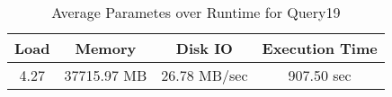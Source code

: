 \documentclass[../../main.tex]{subfiles}
\begin{document}
    \begin{table}
        \begin{center}
            \begin{tabular}{ |c|c|c|c| } 
            \hline
            Load & Memory & Disk IO & Execution Time\\
            \hline
            4.27 & 37715.97 MB & 26.78 MB/sec & 907.50 sec \\
            \hline
            \end{tabular}
            \\[1pt]
            \caption{Average Parametes over Runtime for Query19}
        \end{center}
    \end{table}
    \pagebreak
\end{document}
